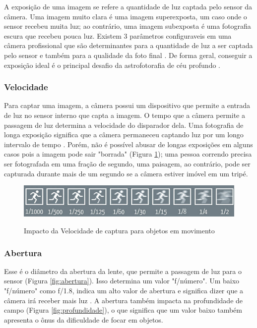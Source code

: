 A exposição de uma imagem se refere a quantidade de luz captada pelo sensor da câmera. Uma imagem muito clara é uma imagem superexposta, um caso onde o sensor recebeu muita luz; ao contrário, uma imagem subexposta é uma fotografia escura que recebeu pouca luz. Existem 3 parâmetros configuraveis em uma câmera profissional que são determinantes para a quantidade de luz a ser captada pelo sensor e também para a qualidade da foto final \cite{site:eduardoemonica}. De forma geral, conseguir a exposição ideal é o principal desafio da astrofotorafia de céu profundo \cite{livro:astropratica}.


\subsubsection{Velocidade}

Para captar uma imagem, a câmera possui um dispositivo que permite a entrada de luz no sensor interno que capta a imagem. O tempo que a câmera permite a passagem de luz determina a velocidade do disparador dela. Uma fotografia de longa exposição significa que a câmera permaneceu captando luz por um longo intervalo de tempo \cite{book:bbcsky}. Porém, não é possível abusar de longas exposições em alguns casos pois a imagem pode sair "borrada" (Figura \ref{fig:velocidade}); uma pessoa correndo precisa ser fotografada em uma fração de segundo, uma paisagem, ao contrário, pode ser capturada durante mais de um segundo se a câmera estiver imóvel em um tripé.  

\begin{figure}[!htb]
	\centering
	\caption{Impacto da Velocidade de captura para objetos em movimento}
	\includegraphics[width=0.7\linewidth]{figuras/velocidade}
	\label{fig:velocidade}
\end{figure}

\subsubsection{Abertura}

Esse é o diâmetro da abertura da lente, que permite a passagem de luz para o sensor (Figura \ref{fig:abertura}). Isso determina um valor "f/número". Um baixo "f/número" como f/1.8, indica um alto valor de abertura e significa dizer que a câmera irá receber mais luz \cite{book:bbcsky}. A abertura também impacta na profundidade de campo (Figura \ref{fig:profundidade}), o que significa que um valor baixo também apresenta o ônus da dificuldade de focar em objetos.

